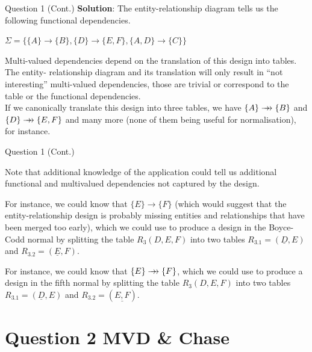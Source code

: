 \begin{frame}[fragile]{Question 1 (Cont.)}
\textbf{Solution}: The entity-relationship diagram tells us the following functional dependencies.\\ \vspace{5pt}

$\Sigma = \{\{A\}\rightarrow\{B\}, \{D\}\rightarrow\{E,F\}, \{A,D\}\rightarrow\{C\}\}$
\\ \vspace{10pt}

Multi-valued dependencies depend on the translation of this design into tables. The entity-
relationship diagram and its translation will only result in ``not interesting'' multi-valued dependencies, those are trivial or correspond to the table or the functional dependencies.\\ \vspace{5pt}
If we canonically translate this design into three tables, we have
$\{A\} \mbox{$\; \rightarrow \! \! \! \! \rightarrow \; $} \{B\}$ and $\{D\}\mbox{$\; \rightarrow \! \! \! \! \rightarrow \; $} \{E,F\}$ and many more (none of them being useful for normalisation), for instance.
\end{frame}

\begin{frame}[fragile]{Question 1 (Cont.)}
	
Note that additional knowledge of the application could tell us additional functional and multivalued dependencies not captured by the design.\\ \vspace{5pt}

For instance, we could know that $\{E\}\rightarrow\{F\}$ (which would suggest that the entity-relationship design is probably missing entities and relationships that have been merged too early), which we could use to produce a design in the Boyce-Codd normal by splitting the table $R_3(D,E,F)$ into two tables $R_{3.1}=(\underline{D},E)$ and $R_{3.2}=(\underline{E},F)$.\\ \vspace{5pt}

For instance, we could know that $\{E\}\mbox{$\; \rightarrow \! \! \! \! \rightarrow \; $}\{F\}$, which we could use to produce a design in the fifth normal by splitting the table $R_3(D,E,F)$ into two tables $R_{3.1}=(\underline{D},E)$ and $R_{3.2}=(\underline{E,F})$.	
\end{frame}

\section*{Question 2 MVD \& Chase}

